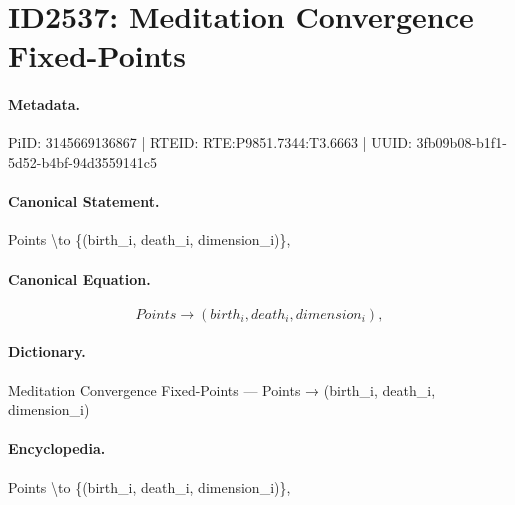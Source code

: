 \section*{ID2537: Meditation Convergence Fixed-Points}
\paragraph{Metadata.}
PiID: 3145669136867 | RTEID: RTE:P9851.7344:T3.6663 | UUID: 3fb09b08-b1f1-5d52-b4bf-94d3559141c5

\paragraph{Canonical Statement.}
Points \textbackslash{}to \{(birth\_i, death\_i, dimension\_i)\},

\paragraph{Canonical Equation.}
\[
Points \to {(birth_i, death_i, dimension_i)},
\]

\paragraph{Dictionary.}
Meditation Convergence Fixed-Points — Points → (birth\_i, death\_i, dimension\_i)

\paragraph{Encyclopedia.}
Points \textbackslash{}to \{(birth\_i, death\_i, dimension\_i)\},
